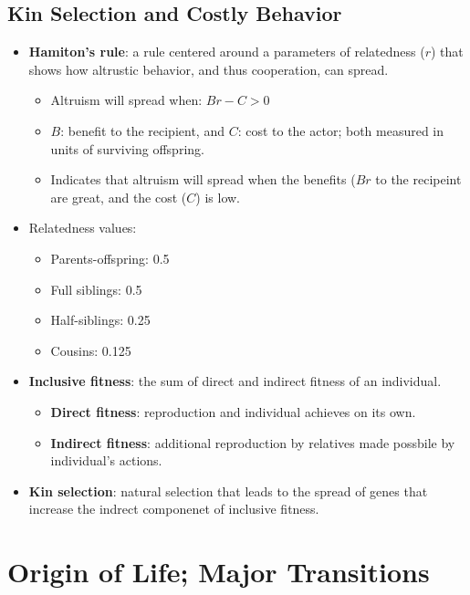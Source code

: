 \documentclass[12pt,a4paper]{article}
\begin{document}
\subsection{Kin Selection and Costly Behavior}
\begin{itemize}
    \item \textbf{Hamiton's rule}: a rule centered around a parameters of relatedness (\(r\)) that shows how altrustic behavior, and thus cooperation, can spread.
        \begin{itemize}
            \item Altruism will spread when: \(Br - C > 0\)
            \item \(B\): benefit to the recipient, and \(C\): cost to the actor; both measured in units of surviving offspring.
            \item Indicates that altruism will spread when the benefits (\(Br\) to the recipeint are great, and the cost (\(C\)) is low.
        \end{itemize}
    \item Relatedness values:
        \begin{itemize}
            \item Parents-offspring: 0.5
            \item Full siblings: 0.5
            \item Half-siblings: 0.25
            \item Cousins: 0.125
        \end{itemize}
    \item \textbf{Inclusive fitness}: the sum of direct and indirect fitness of an individual.
        \begin{itemize}
            \item \textbf{Direct fitness}: reproduction and individual achieves on its own. 
            \item \textbf{Indirect fitness}: additional reproduction by relatives made possbile by individual's actions.
        \end{itemize}
    \item \textbf{Kin selection}: natural selection that leads to the spread of genes that increase the indrect componenet of inclusive fitness.
\end{itemize}

\setcounter{section}{16}
\clearpage
\section{Origin of Life; Major Transitions}
\end{document}
